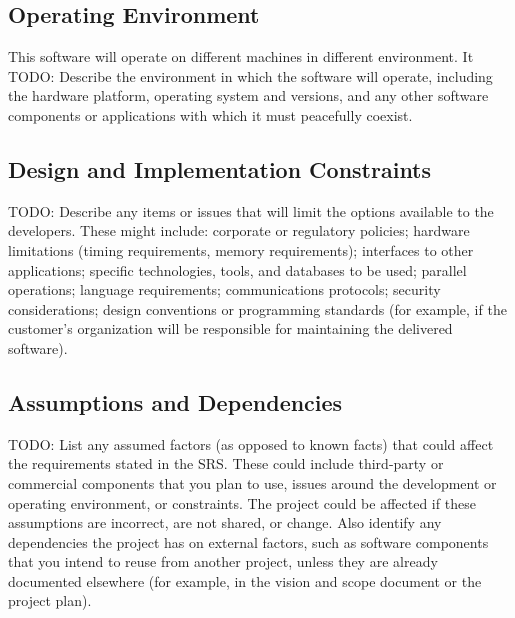 \subsection{Operating Environment}
This software will operate on different machines in different environment. It
TODO: Describe the environment in which the software will operate, including the hardware platform, operating system and versions, and any other software components or applications with which it must peacefully coexist.
\subsection{Design and Implementation Constraints}
TODO: Describe any items or issues that will limit the options available to the developers. These might include: corporate or regulatory policies; hardware limitations (timing requirements, memory requirements); interfaces to other applications; specific technologies, tools, and databases to be used; parallel operations; language requirements; communications protocols; security considerations; design conventions or programming standards (for example, if the customer’s organization will be responsible for maintaining the delivered software).
\subsection{Assumptions and Dependencies}
TODO: List any assumed factors (as opposed to known facts) that could affect the requirements stated in the SRS. These could include third-party or commercial components that you plan to use, issues around the development or operating environment, or constraints. The project could be affected if these assumptions are incorrect, are not shared, or change. Also identify any dependencies the project has on external factors, such as software components that you intend to reuse from another project, unless they are already documented elsewhere (for example, in the vision and scope document or the project plan).